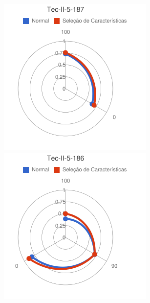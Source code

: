 \begin{figure}
\centering
\begin{minipage}{.3\textwidth}
  \centering
  \includegraphics[width=\linewidth]{img/red-ufes-moodle/image13.png}
\end{minipage}%
\begin{minipage}{.3\textwidth}
  \centering
  \includegraphics[width=\linewidth]{img/red-ufes-moodle/image14.png}

\end{minipage}
\end{figure}
